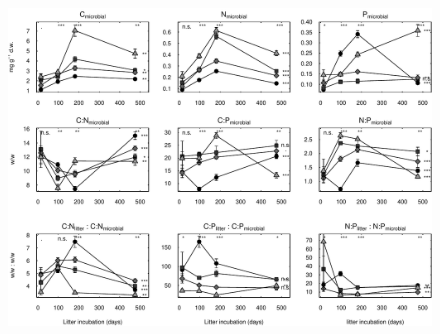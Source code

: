 \documentclass[10pt]{article}
\begin{document}
\begin{flushleft}
% 
% 
\begin{figure}[!ht]
\begin{center}
\includegraphics{ligpaper-mb}
\end{center}
\end{figure}




\end{flushleft}
\end{document}
